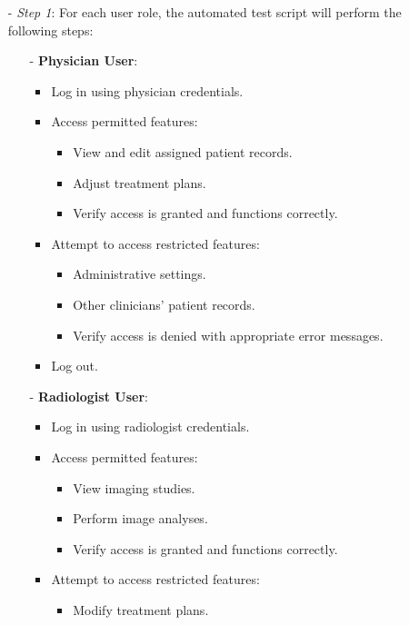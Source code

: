 \documentclass[12pt, titlepage]{article}
\begin{document}
\begin{enumerate}
\begin{itemize}
  \item[-] \textit{Step 1}: For each user role, the automated test script will perform the following steps:
    \begin{itemize}
      \item[-] \textbf{Physician User}:
        \begin{itemize}
          \item Log in using physician credentials.
          \item Access permitted features:
            \begin{itemize}
              \item View and edit assigned patient records.
              \item Adjust treatment plans.
              \item Verify access is granted and functions correctly.
            \end{itemize}
          \item Attempt to access restricted features:
            \begin{itemize}
              \item Administrative settings.
              \item Other clinicians' patient records.
              \item Verify access is denied with appropriate error messages.
            \end{itemize}
          \item Log out.
        \end{itemize}
      \item[-] \textbf{Radiologist User}:
        \begin{itemize}
          \item Log in using radiologist credentials.
          \item Access permitted features:
            \begin{itemize}
              \item View imaging studies.
              \item Perform image analyses.
              \item Verify access is granted and functions correctly.
            \end{itemize}
          \item Attempt to access restricted features:
            \begin{itemize}
              \item Modify treatment plans.

\end{itemize}
\end{itemize}
\end{itemize}
\end{itemize}
\end{enumerate}
\end{document}
